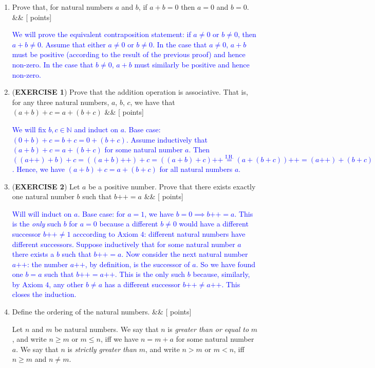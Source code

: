 \documentclass[12pt]{article}
\newcommand{\points}[1]{\hfill {[#1 points]}}
\newcommand{\problem}[2][]{%
  \item {#2}%
  \ifx&#1&%
  \else%
    \points{#1}%
  \fi
  \par\vspace{0.5em}
}
\begin{document}
\begin{enumerate}[leftmargin=*, label=\textbf{\arabic*.}]
	\problem{Prove that, for natural numbers $a$ and $b$, if $a + b = 0$ then $a = 0$ and $b = 0$.}
	\textcolor{blue}{We will prove the equivalent contraposition statement: if $a \neq 0$ or $b \neq 0$, then $a + b \neq 0$. Assume that either $a \neq 0$ or $b \neq 0$. In the case that $a \neq 0$, $a+b$ must be positive (according to the result of the previous proof) and hence non-zero. In the case that $b \neq 0$, $a+b$ must similarly be positive and hence non-zero.}
	
    \problem{(\textbf{EXERCISE 1}) Prove that the addition operation is associative. That is, for any three natural numbers, $a$, $b$, $c$, we have that $(a+b)+c = a+(b+c)$}
    	\textcolor{blue}{We will fix $b,c \in \mathbb{N}$ and induct on $a$. Base case: $(0 + b) + c = b + c = 0 + (b + c).$ Assume inductively that $(a + b) + c = a + (b + c)$ for some natural number $a$. Then $((a\text{++}) + b) + c = ((a + b)\text{++}) + c = ((a+b) + c)\text{++} \overset{\text{I.H.}}{=} (a + (b + c))\text{++} = (a\text{++}) + (b+c)$. Hence, we have $(a+b)+c = a+(b+c)$ for all natural numbers $a$.}
	
	\problem{(\textbf{EXERCISE 2}) Let $a$ be a positive number. Prove that there exists exactly one natural number $b$ such that $b\text{++} = a$}
	\textcolor{blue}{Will will induct on $a$. Base case: for $a = 1$, we have $b=0 \implies b\text{++} = a$. This is the \textit{only} such $b$ for $a=0$ because a different $b \neq 0$ would have a different successor $b\text{++} \neq 1$ acccording to Axiom $4$: different natural numbers have different successors. Suppose inductively that for some natural number $a$ there exists a $b$ such that $b\text{++} = a$. Now consider the next natural number $a\text{++}$: the number $a\text{++}$, by definition, is the successor of $a$. So we have found one $b=a$ such that $b\text{++} = a\text{++}$. This is the only such $b$ because, similarly, by Axiom $4$, any other $b \neq a$ has a different successor $b\text{++} \neq a\text{++}$. This closes the induction.}
	
	\problem{Define the ordering of the natural numbers.}
	Let $n$ and $m$ be natural numbers. We say that $n$ is \textit{greater than or equal to} $m$, and write $n \geq m$ or $m \leq n$, iff we have $n = m + a$ for some natural number $a$. We say that $n$ is \textit{strictly greater than} $m$, and write $n > m$ or $m < n$, iff $n \geq m$ and $n \neq m$.
	

\end{enumerate}
\end{document}

